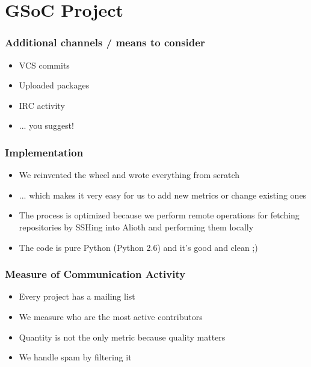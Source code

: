 \documentclass[compress]{beamer}
\begin{document}
\section{GSoC Project}

\begin{frame}
  \frametitle{Additional channels / means %
              to consider
             }
  \begin{itemize}
    \item VCS commits
    \item Uploaded packages
    \item IRC activity %
    \item ... you suggest!
  \end{itemize}
\end{frame}

\begin{frame}
    \frametitle{Implementation}
    \begin{itemize}
        \item We reinvented the wheel and wrote everything from scratch 
        \item ... which makes it very easy for us to add new metrics or change existing ones
        \item The process is optimized because we perform remote operations for fetching repositories by SSHing into Alioth and performing them locally
        \item The code is pure Python (Python 2.6) and it's good and clean ;)
    \end{itemize}
\end{frame}

\begin{frame}
  \frametitle{Measure of Communication Activity}
  \begin{itemize}
     \item Every project has a mailing list
     \item We measure who are the most active contributors
     \item Quantity is not the only metric because quality matters 
     \item We handle spam by filtering it
  \end{itemize}
\end{frame}
\end{document}
